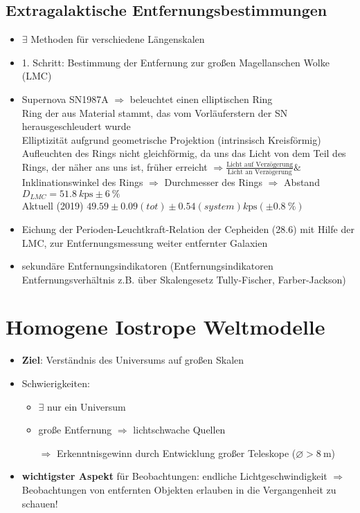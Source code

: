 \subsection{Extragalaktische Entfernungsbestimmungen}
\begin{itemize}
	\item $\exists$ Methoden für verschiedene Längenskalen
	\item 1. Schritt: Bestimmung der Entfernung zur großen Magellanschen Wolke (LMC)
	\item Supernova SN1987A $\Rightarrow $ beleuchtet einen elliptischen Ring\\
		Ring der aus Material stammt, das vom Vorläuferstern der SN herausgeschleudert wurde\\
		Elliptizität aufgrund geometrische Projektion (intrinsisch Kreisförmig)\\
		Aufleuchten des Rings nicht gleichförmig, da uns das Licht von dem Teil des Rings, der näher ans uns ist, früher erreicht $\Rightarrow \frac{\text{Licht auf Verzögerung}}{\text{Licht an Verzögerung}} \& $ Inklinationswinkel des Rings $\Rightarrow $ Durchmesser des Rings $\Rightarrow$ Abstand $D_{LMC}=\SI{51.8}{k\ps}\pm\SI{6}{\%}$\\
		Aktuell (2019) $\num{49.59}\pm\num{0.09} (tot)\pm\num{0.54}(system)\si{k\ps}(\pm\SI{0.8}{\%})$
	\item Eichung der Perioden-Leuchtkraft-Relation der Cepheiden (\num{28.6}) mit Hilfe der LMC, zur Entfernungsmessung weiter entfernter Galaxien
	\item sekundäre Entfernungsindikatoren (Entfernungsindikatoren Entfernungsverhältnis z.B. über Skalengesetz Tully-Fischer, Farber-Jackson)
\end{itemize}
\section{Homogene Iostrope Weltmodelle}
\begin{itemize}
	\item \textbf{Ziel}: Verständnis des Universums auf großen Skalen
	\item Schwierigkeiten:
		\begin{itemize}[label={$\cdot$}]
			\item $\exists$ nur ein Universum
			\item große Entfernung $\Rightarrow$ lichtschwache Quellen
			\item[$\Rightarrow$] Erkenntnisgewinn durch Entwicklung großer Teleskope ($\diameter>\SI{8}{\m}$) 
		\end{itemize}
	\item \textbf{wichtigster Aspekt} für Beobachtungen: endliche Lichtgeschwindigkeit $\Rightarrow$ Beobachtungen von entfernten Objekten erlauben in die Vergangenheit zu schauen!
\end{itemize}

